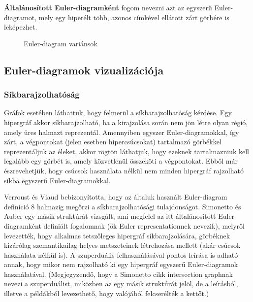 \begin{definition}
\textbf{Általánosított Euler-diagramként} fogom nevezni azt az egyszerű Euler-diagramot, mely egy hiperélt több, azonos címkével ellátott zárt görbére is leképezhet.
\end{definition}

\begin{figure}[H]
	\centering
	\hspace{5pt}
	\caption{Euler-diagram variánsok}
	\label{fig:euler_general}
\end{figure}



\subsection{Euler-diagramok vizualizációja}

\subsubsection{Síkbarajzolhatóság}
Gráfok esetében láthattuk, hogy felmerül a síkbarajzolhatóság kérdése. Egy hipergráf akkor síkbarajzolható, ha a kirajzolása során nem jön létre olyan régió, amely üres halmazt reprezentál. Amennyiben egyszer Euler-diagramokkal, így zárt, a végpontokat (jelen esetben hipercsúcsokat) tartalmazó görbékkel reprezentáljuk az éleket, akkor rögtön láthatjuk, hogy ezeknek tartalmazniuk kell legalább egy görbét is, amely közvetlenül összeköti a végpontokat. Ebből már észrevehetjük, hogy csúcsok használata nélkül nem minden hipergráf rajzolható síkba egyszerű Euler-diagramokkal.


Verroust és Viaud bebizonyította\cite{drawability_8_sets}, hogy az általuk használt Euler-diagram definíció 8 halmazig megőrzi a síkbarajzolhatósági tulajdonságot. Simonetto és Auber egy másik struktúrát vizsgált\cite{simonetto_undrawable}, ami megfelel az itt általánosított Euler-diagramként definiált fogalomnak (ők Euler representationnek nevezik), melyről levezették, hogy alkalmas tetszőleges hipergráf síkbarajzolására, görbéknek kizárólag szemantikailag helyes metszeteinek létrehozása mellett (akár csúcsok használata nélkül is). A szuperduális felhasználásával pontos leírása is adható annak, hogy mikor nem rajzolható ki egy hipergráf egyszerű Euler-diagramok használatával\cite{simonetto_undrawable, drawability_8_sets}. (Megjegyzendő, hogy a Simonetto cikk intersection graphnak nevezi a szuperduálist, miközben az egy másik struktúrát jelöl, de a leírásból, illetve a példákból levezethető, hogy valójából felcserélték a kettőt.)

